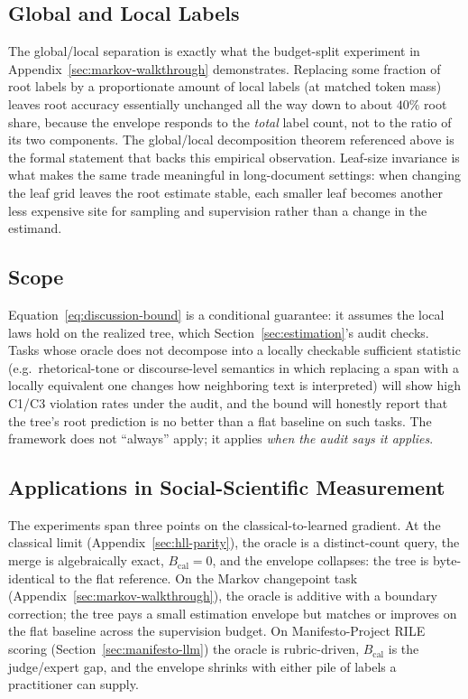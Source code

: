 \subsection{Global and Local Labels}

The global/local separation is exactly what the budget-split
experiment in Appendix~\ref{sec:markov-walkthrough} demonstrates.
Replacing some fraction of root labels by a proportionate amount of
local labels (at matched token mass) leaves root accuracy essentially
unchanged all the way down to about $40\%$ root share, because the
envelope responds to the \emph{total} label count, not to the ratio
of its two components. The global/local decomposition theorem referenced
above is the formal statement that backs this empirical observation.
Leaf-size invariance is what makes the same trade meaningful in
long-document settings: when changing the leaf grid leaves the root
estimate stable, each smaller leaf becomes another less expensive site
for sampling and supervision rather than a change in the estimand.

\subsection{Scope}

Equation~\eqref{eq:discussion-bound} is a conditional guarantee: it
assumes the local laws hold on the realized tree, which
Section~\ref{sec:estimation}'s audit checks. Tasks whose oracle does
not decompose into a locally checkable sufficient statistic (e.g.\
rhetorical-tone or discourse-level semantics in which replacing a
span with a locally equivalent one changes how neighboring text is
interpreted) will show high C1/C3 violation rates under the audit,
and the bound will honestly report that the tree's root prediction is
no better than a flat baseline on such tasks. The framework does not
``always'' apply; it applies \emph{when the audit says it applies}.

\subsection{Applications in Social-Scientific Measurement}

The experiments span three points on the classical-to-learned
gradient. At the classical limit (Appendix~\ref{sec:hll-parity}), the
oracle is a distinct-count query, the merge is algebraically exact,
$B_{\mathrm{cal}} = 0$, and the envelope collapses: the tree is
byte-identical to the flat reference. On the Markov changepoint task
(Appendix~\ref{sec:markov-walkthrough}), the oracle is additive with a
boundary correction; the tree pays a small estimation envelope but
matches or improves on the flat baseline across the supervision
budget. On Manifesto-Project RILE scoring (Section~\ref{sec:manifesto-llm})
the oracle is rubric-driven, $B_{\mathrm{cal}}$ is the judge/expert
gap, and the envelope shrinks with either pile of labels a
practitioner can supply.

